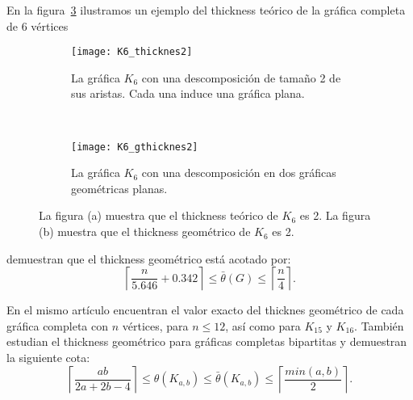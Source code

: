 En la figura~\ref{fig:thicknessexample} ilustramos un ejemplo del thickness teórico de
la gráfica completa de 6 vértices
\begin{figure}[htb]
  \centering
\begin{subfigure}[h]{.5\textwidth}
  \centering
  \texttt{[image: K6\_thicknes2]}
  \caption{La gráfica $K_6$ con una descomposición de tamaño 2 de sus aristas. Cada una induce una gráfica plana.}
  \label{fig:thk6}
\end{subfigure}%
\\
\begin{subfigure}[h]{.5\textwidth}
  \centering
  \texttt{[image: K6\_gthicknes2]}
  \caption{La gráfica $K_6$ con una descomposición en dos gráficas geométricas planas.}
  \label{fig:gthk6}
\end{subfigure}
\caption{La figura (a) muestra que el thickness teórico de $K_6$ es 2. La figura (b) muestra que el thickness geométrico de $K_6$ es 2.}
\label{fig:thicknessexample}
\end{figure}




\cite{Dillencourt2004} demuestran que el thickness geométrico está acotado por:
\[ \left\lceil \frac{n}{5.646} + 0.342 \right\rceil \leq  \bar{\theta}(G) \leq \left\lceil\frac{n}{4}\right\rceil .\]

En el mismo artículo encuentran el valor exacto del thicknes geométrico
de cada gráfica completa con $n$ vértices, para $n\leq 12$, así como para $K_{15}$ y $K_{16}$.
También estudian el thickness geométrico para gráficas completas bipartitas y demuestran la
siguiente cota:
\[
  \left\lceil \frac{ab}{2a+2b-4} \right\rceil \leq \theta(K_{a,b}) \leq \bar{\theta}(K_{a,b})
  \leq \left\lceil \frac{min(a,b)}{2} \right\rceil.
\]

